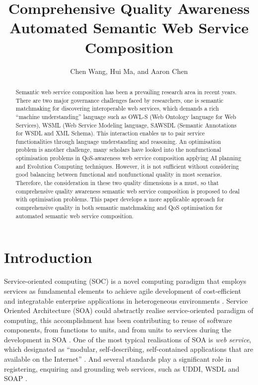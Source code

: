 \documentclass{llncs}
\title{Comprehensive Quality Awareness Automated Semantic Web Service Composition}
\author{Chen Wang, Hui Ma, and Aaron Chen}
\institute{School of Engineering and Computer Science,
\\Victoria University of Wellington, New Zealand \\
\email{\{Chen.Wang, Hui.Ma, and Aaron.Chen\}@ecs.vuw.ac.nz }}
\begin{document}
\maketitle

\begin{abstract}
Semantic web service composition has been a prevailing research area in recent years. There are two major governance challenges faced by researchers, one is semantic matchmaking for discovering interoperable web services, which demands a rich “machine understanding” language such as OWL-S (Web Ontology language for Web Services), WSML (Web Service Modeling language, SAWSDL (Semantic Annotations for WSDL and XML Schema). This interaction enables us to pair service functionalities through language understanding and reasoning. An optimisation problem is another challenge, many scholars have looked into the nonfunctional optimisation problems in QoS-awareness web service composition applying AI planning and Evolution Computing techniques. However, it is not sufficient without considering good balancing between functional and nonfunctional quality in most scenarios. Therefore, the consideration in these two quality dimensions is a must, so that comprehensive quality  awareness semantic web service composition is proposed to deal with optimisation problems. This paper develops a more applicable approach for comprehensive quality in both semantic matchmaking and QoS optimisation for automated semantic web service composition.
\end{abstract}

\section{Introduction}\label{introduction}
Service-oriented computing (SOC) is a novel computing paradigm that employs services as fundamental elements to achieve agile development of cost-efficient and integratable enterprise applications in heterogeneous environments \cite{papazoglou2003service}. Service Oriented Architecture (SOA) could abstractly realise service-oriented paradigm of computing, this accomplishment has been contributing to reuse of software components, from functions to units, and from units to services during the development in SOA \cite{booth2004web}. One of the most typical realisations of SOA is \textit{web service}, which designated as ``modular, self-describing, self-contained applications that are available on the Internet'' \cite{curbera2001web}. And several standards play a significant role in registering, enquiring and grounding web services, such as UDDI, WSDL and SOAP \cite{fensel2011semantic}.
\end{document}
